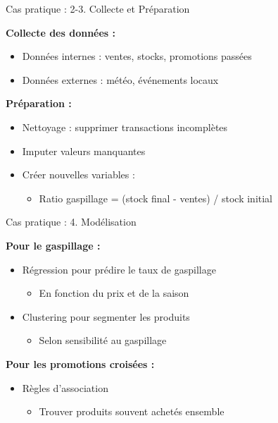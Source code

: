 \begin{frame}{Cas pratique : 2-3. Collecte et Préparation}

\textbf{Collecte des données :}
\begin{itemize}
    \item Données internes : ventes, stocks, promotions passées
    \item Données externes : météo, événements locaux
\end{itemize}

\vspace{0.3cm}

\textbf{Préparation :}
\begin{itemize}
    \item Nettoyage : supprimer transactions incomplètes
    \item Imputer valeurs manquantes
    \item Créer nouvelles variables :
        \begin{itemize}
            \item Ratio gaspillage = (stock final - ventes) / stock initial
        \end{itemize}
\end{itemize}

\end{frame}

\begin{frame}{Cas pratique : 4. Modélisation}

\textbf{Pour le gaspillage :}
\begin{itemize}
    \item<+-> Régression pour prédire le taux de gaspillage
        \begin{itemize}
            \item En fonction du prix et de la saison
        \end{itemize}
    \item<+-> Clustering pour segmenter les produits
        \begin{itemize}
            \item Selon sensibilité au gaspillage
        \end{itemize}
\end{itemize}

\vspace{0.3cm}

\textbf{Pour les promotions croisées :}
\begin{itemize}
    \item Règles d'association
        \begin{itemize}
            \item Trouver produits souvent achetés ensemble
        \end{itemize}
\end{itemize}

\end{frame}

